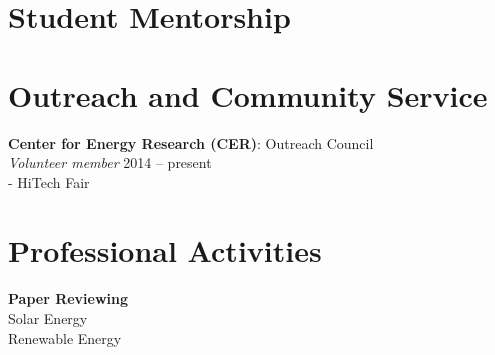 \documentclass[]{res}
\begin{document}
\begin{resume}
\section{Student Mentorship}
\vspace{0.1in}
%
%
%
%
%
%


\section{Outreach and Community Service}
\vspace{0.1in}
%

\textbf{Center for Energy Research (CER)}: Outreach Council \\
\textit{Volunteer member} \hfill 2014 -- present \\
- HiTech Fair


\section{Professional Activities}
\vspace{0.1in}

\textbf{Paper Reviewing} \\
Solar Energy \\
Renewable Energy \\


\end{resume}
\end{document}
